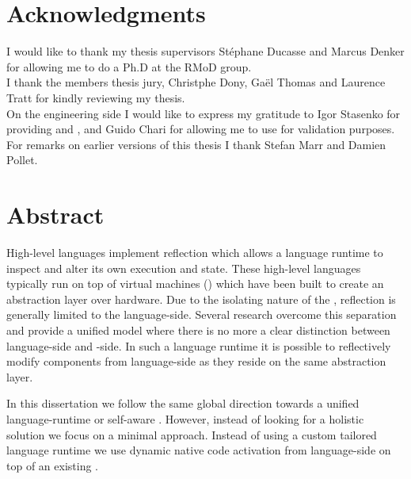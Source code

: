 \documentclass[a4paper,11pt,twoside]{include/ThesisStyle}
\begin{document}


\dominitoc

\cleardoublepage
\chapter*{Acknowledgments}

I would like to thank my thesis supervisors Stéphane Ducasse and Marcus Denker for allowing me to do a Ph.D at the RMoD group.\\

\noindent I thank the members thesis jury, Christphe Dony, Gaël Thomas and Laurence Tratt for kindly reviewing my thesis.\\

\noindent  On the engineering side I would like to express my gratitude to Igor Stasenko for providing \B and \NB, and Guido Chari for allowing me to use \WF for validation purposes.\\

\noindent For remarks on earlier versions of this thesis I thank Stefan Marr and Damien Pollet.


\chapter*{Abstract}
High-level languages implement reflection which allows a language runtime to inspect and alter its own execution and state.
These high-level languages typically run on top of virtual machines (\VMs) which have been built to create an abstraction layer over hardware.
Due to the isolating nature of the \VM, reflection is generally limited to the language-side.
Several research \VMs overcome this separation and provide a unified model where there is no more a clear distinction between language-side and \VM-side.
In such a language runtime it is possible to reflectively modify \VM components from language-side as they reside on the same abstraction layer.

In this dissertation we follow the same global direction towards a unified language-runtime or self-aware \VM.
However, instead of looking for a holistic solution we focus on a minimal approach.
Instead of using a custom tailored language runtime we use dynamic native code activation from language-side on top of an existing \VM.
\end{document}
